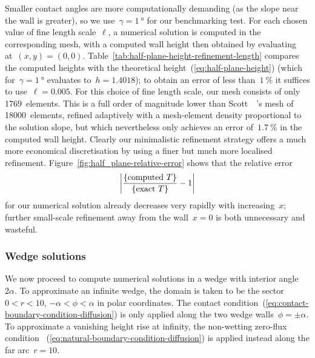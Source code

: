 Smaller contact angles are more computationally demanding
(as the slope near the wall is greater),
so we use~$\gamma = \SI{1}{\degree}$ for our benchmarking test.
For each chosen value of fine length scale~$\ell$,
a numerical solution is computed in the corresponding mesh,
with a computed wall height then obtained
by evaluating at~$(x, y) = (0, 0)$.
Table~\ref{tab:half-plane-height-refinement-length}
compares the computed heights
with the theoretical height~(\ref{eq:half-plane-height})
(which for~$\gamma = \SI{1}{\degree}$ evaluates to~$h = 1.4018$);
to obtain an error of less than~$\SI{1}{\percent}$
it suffices to use~$\ell = 0.005$.
For this choice of fine length scale,
our mesh consists of only 1769~elements.
This is a full order of magnitude lower than
Scott~\etal~\cite{scott-2005-computation-capillary-laplace-young}'s
mesh of 18000~elements, refined adaptively
with a mesh-element density proportional to the solution slope,
but which nevertheless only achieves an error of~$\SI{1.7}{\percent}$
in the computed wall height.
Clearly our minimalistic refinement strategy
offers a much more economical discretisation
by using a finer but much more localised refinement.
Figure~\ref{fig:half_plane-relative-error}
shows that the relative error
\begin{equation}
  \abs*{\frac{\textq{computed~$T$}}{\textq{exact~$T$}} - 1}
  \label{eq:half-plane-relative-error}
\end{equation}
for our numerical solution already decreases very rapidly
with increasing~$x$;
further small-scale refinement away from the wall~$x = 0$
is both unnecessary and wasteful.

\begin{figure}
\end{figure}

\subsubsection{Wedge solutions}
\label{sec:moderate.nonlinear.numerical.wedge}

We now proceed to compute numerical solutions
in a wedge with interior angle~$2 \alpha$.
To approximate an infinite wedge,
the domain is taken to be the sector
$0 < r < 10$, $-\alpha < \phi < \alpha$
in polar coordinates.
The contact condition~(\ref{eq:contact-boundary-condition-diffusion})
is only applied along the two wedge walls~$\phi = \pm \alpha$.
To approximate a vanishing height rise at infinity,
the non-wetting zero-flux condition~%
  (\ref{eq:natural-boundary-condition-diffusion})
is applied instead along the far arc~$r = 10$.

